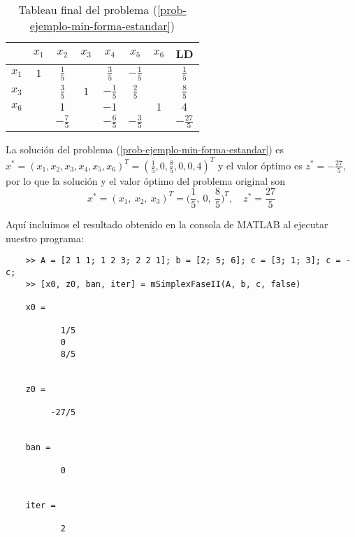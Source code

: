 \documentclass[titlepage]{article}
\begin{document}
\begin{table}[ht]
    \centering
    \begin{tabular}{|c|c|c|c|c|c|c|c|}
        \hline
                & $x_1$ & $x_2$             & $x_3$     & $x_4$               & $x_5$           & $x_6$ & LD                \\ \hline
        $x_1$   & $1$   & $\frac{1}{5}$     &           & $\frac{3}{5}$       & $-\frac{1}{5}$  &       & $\frac{1}{5}$     \\ \hline
        $x_3$   &       & $\frac{3}{5}$     & $1$       & $-\frac{1}{5}$      & $\frac{2}{5}$   &       & $\frac{8}{5}$     \\ \hline
        $x_6$   &       & $1$               &           & $-1$                &                 & $1$   & $4$               \\ \hline
                &       & $-\frac{7}{5}$    &           & $-\frac{6}{5}$      & $-\frac{3}{5}$  &       & $-\frac{27}{5}$             \\ \hline
    \end{tabular}
    \caption{Tableau final del problema (\ref{prob-ejemplo-min-forma-estandar})}
    \label{tab:tablaeau-final}
\end{table}

La solución del problema (\ref{prob-ejemplo-min-forma-estandar}) es $x^* = (x_1,x_2, x_3, x_4, x_5, x_6)^T = (\frac{1}{5}, 0, \frac{8}{5}, 0, 0, 4)^T$ y el valor óptimo es $z^* = -\frac{27}{5}$, por lo que la solución y el valor óptimo del problema original son
\begin{equation*}
    x^* = (x_1,\ x_2,\ x_3)^T = \Bigg(\frac{1}{5},\ 0,\ \frac{8}{5}\Bigg)^T, \quad z^* = \frac{27}{5}
\end{equation*}

Aquí incluimos el resultado obtenido en la consola de MATLAB al ejecutar nuestro programa: 

\begin{verbatim}
    >> A = [2 1 1; 1 2 3; 2 2 1]; b = [2; 5; 6]; c = [3; 1; 3]; c = -c;
    >> [x0, z0, ban, iter] = mSimplexFaseII(A, b, c, false)
    
    x0 =
    
           1/5     
           0       
           8/5     
    
    
    z0 =
    
         -27/5     
    
    
    ban =
    
           0       
    
    
    iter =
    
           2  
\end{verbatim}
\end{document}

